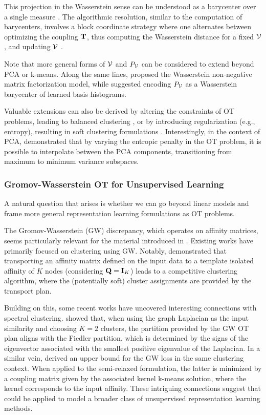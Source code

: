 This projection in the Wasserstein sense can be understood as a barycenter over a single measure \citep{agueh2011barycenters}. The algorithmic resolution, similar to the computation of barycenters, involves a block coordinate strategy where one alternates between optimizing the coupling ${\mathbf{T}}$, thus computing the Wasserstein distance for a fixed ${\mathcal{V}}$, and updating ${\mathcal{V}}$ \citep{cuturi2014fast}. 

Note that more general forms of ${\mathcal{V}}$ and $P_{{\mathcal{V}}}$ can be considered to extend beyond PCA or k-means. Along the same lines, \citep{sandler2011nonnegative} proposed the Wasserstein non-negative matrix factorization model, while \citep{schmitz2018wasserstein} suggested encoding $P_{{\mathcal{V}}}$ as a Wasserstein barycenter of learned basis histograms.

Valuable extensions can also be derived by altering the constraints of OT problems, leading to balanced clustering \citep{de2023balanced}, or by introducing regularization (e.g., entropy), resulting in soft clustering formulations \citep{ferraro2020soft}. Interestingly, in the context of PCA, \cite{collas2023entropic} demonstrated that by varying the entropic penalty in the OT problem, it is possible to interpolate between the PCA components, transitioning from maximum to minimum variance subspaces.


\subsubsection{Gromov-Wasserstein OT for Unsupervised Learning}

A natural question that arises is whether we can go beyond linear models and frame more general representation learning formulations as OT problems.

The Gromov-Wasserstein (GW) discrepancy, which operates on affinity matrices, seems particularly relevant for the material introduced in . Existing works have primarily focused on clustering using GW. Notably, \citep{xu2019scalable} demonstrated that transporting an affinity matrix defined on the input data to a template isolated affinity of $K$ nodes (\ie considering ${\mathbf{Q}} = {\mathbf{I}}_K$) leads to a competitive clustering algorithm, where the (potentially soft) cluster assignments are provided by the transport plan. 

Building on this, some recent works have uncovered interesting connections with spectral clustering. \citep{chowdhury2021generalized} showed that, when using the graph Laplacian as the input similarity and choosing $K=2$ clusters, the partition provided by the GW OT plan aligns with the Fiedler partition, which is determined by the signs of the eigenvector associated with the smallest positive eigenvalue of the Laplacian. In a similar vein, \citep{chen2023gromov} derived an upper bound for the GW loss in the same clustering context. When applied to the semi-relaxed formulation, the latter is minimized by a coupling matrix given by the associated kernel k-means solution, where the kernel corresponds to the input affinity. These intriguing connections suggest that  could be applied to model a broader class of unsupervised representation learning methods.



